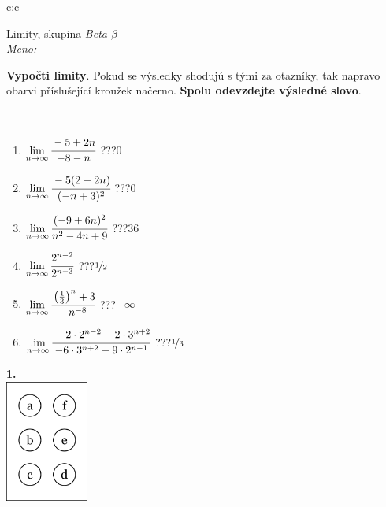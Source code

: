 \documentclass[10pt]{report}
\begin{document}
\begin{tabular}{c:c}
\begin{minipage}[c][104.5mm][t]{0.5\linewidth}
\begin{center}
\vspace{7mm}
{\huge Limity, skupina \textit{Beta $\beta$} -}\\[5mm]
\textit{Meno:}\phantom{xxxxxxxxxxxxxxxxxxxxxxxxxxxxxxxxxxxxxxxxxxxxxxxxxxxxxxxxxxxxxxxxx}\\[5mm]
\begin{minipage}{0.95\linewidth}
\begin{center}
\textbf{Vypočti limity}. Pokud se výsledky shodujú s tými za otazníky, tak napravo\\obarvi příslušející kroužek načerno. \textbf{Spolu odevzdejte výsledné slovo}.
\end{center}
\end{minipage}
\\[1mm]
\begin{minipage}{0.79\linewidth}
\begin{center}
\begin{varwidth}{\linewidth}
\begin{enumerate}
\normalsize
\item $\lim\limits_{n\to\infty}\cfrac{-5+2n}{-8-n}$\quad \dotfill\; ???\;\dotfill \quad $0$
\item $\lim\limits_{n\to\infty}\cfrac{-5(2-2n)}{(-n+3)^2}$\quad \dotfill\; ???\;\dotfill \quad $0$
\item $\lim\limits_{n\to\infty}\cfrac{(-9+6n)^2}{n^2-4n+9}$\quad \dotfill\; ???\;\dotfill \quad $36$
\item $\lim\limits_{n\to\infty}\cfrac{2^{n-2}}{2^{n-3}}$\quad \dotfill\; ???\;\dotfill \quad $\nicefrac{1}{2}$
\item $\lim\limits_{n\to\infty}\cfrac{\left(\frac{1}{3}\right)^n +3}{-n^{-8}}$\quad \dotfill\; ???\;\dotfill \quad $-\infty$
\item $\lim\limits_{n\to\infty}\cfrac{-2\cdot 2^{n-2}-2\cdot 3^{n+2}}{-6\cdot 3^{n+2}-9\cdot 2^{n-1}}$\quad \dotfill\; ???\;\dotfill \quad $\nicefrac{1}{3}$
\end{enumerate}
\end{varwidth}
\end{center}
\end{minipage}
\begin{minipage}{0.20\linewidth}
\begin{center}
{\Huge\bfseries 1.} \\[2mm]
\includegraphics[height=40mm]{../images/braille.png}

\end{center}
\end{minipage}
\end{center}
\end{minipage}
\end{tabular}
\end{document}
